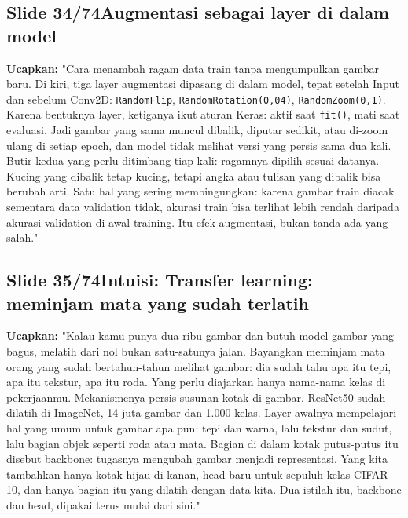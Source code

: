 \documentclass[11pt]{article}
\renewcommand{\framebox}[1]{\colorbox{acc!15}{\textcolor{acc}{\textbf{#1}}}}
\begin{document}
\subsection*{\framebox{Slide 34/74}\quad Augmentasi sebagai layer di dalam model}
\textbf{Ucapkan:} "Cara menambah ragam data train tanpa mengumpulkan gambar baru. Di kiri, tiga layer augmentasi dipasang di dalam model, tepat setelah Input dan sebelum Conv2D: \texttt{RandomFlip}, \texttt{RandomRotation(0,04)}, \texttt{RandomZoom(0,1)}. Karena bentuknya layer, ketiganya ikut aturan Keras: aktif saat \texttt{fit()}, mati saat evaluasi. Jadi gambar yang sama muncul dibalik, diputar sedikit, atau di-zoom ulang di setiap epoch, dan model tidak melihat versi yang persis sama dua kali. Butir kedua yang perlu ditimbang tiap kali: ragamnya dipilih sesuai datanya. Kucing yang dibalik tetap kucing, tetapi angka atau tulisan yang dibalik bisa berubah arti. Satu hal yang sering membingungkan: karena gambar train diacak sementara data validation tidak, akurasi train bisa terlihat lebih rendah daripada akurasi validation di awal training. Itu efek augmentasi, bukan tanda ada yang salah."\\[2pt]

\subsection*{\framebox{Slide 35/74}\quad Intuisi: Transfer learning: meminjam mata yang sudah terlatih}
\textbf{Ucapkan:} "Kalau kamu punya dua ribu gambar dan butuh model gambar yang bagus, melatih dari nol bukan satu-satunya jalan. Bayangkan meminjam mata orang yang sudah bertahun-tahun melihat gambar: dia sudah tahu apa itu tepi, apa itu tekstur, apa itu roda. Yang perlu diajarkan hanya nama-nama kelas di pekerjaanmu. Mekanismenya persis susunan kotak di gambar. ResNet50 sudah dilatih di ImageNet, 14 juta gambar dan 1.000 kelas. Layer awalnya mempelajari hal yang umum untuk gambar apa pun: tepi dan warna, lalu tekstur dan sudut, lalu bagian objek seperti roda atau mata. Bagian di dalam kotak putus-putus itu disebut backbone: tugasnya mengubah gambar menjadi representasi. Yang kita tambahkan hanya kotak hijau di kanan, head baru untuk sepuluh kelas CIFAR-10, dan hanya bagian itu yang dilatih dengan data kita. Dua istilah itu, backbone dan head, dipakai terus mulai dari sini."\\[2pt]
\end{document}
